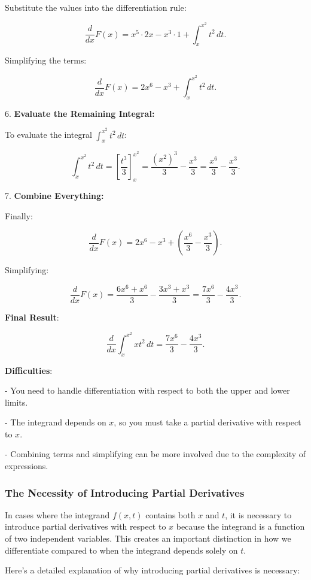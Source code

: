 \documentclass[a4paper,12pt]{book}
\begin{document}
   Substitute the values into the differentiation rule:

   \[
   \dfrac{d}{dx} F(x) = x^5 \cdot 2x - x^3 \cdot 1 + \int_{x}^{x^2} t^2 \, dt.
   \]

   Simplifying the terms:

   \[
   \dfrac{d}{dx} F(x) = 2x^6 - x^3 + \int_{x}^{x^2} t^2 \, dt.
   \]

6. \textbf{Evaluate the Remaining Integral:}

   To evaluate the integral \(\int_{x}^{x^2} t^2 \, dt\):

   \[
   \int_{x}^{x^2} t^2 \, dt = \left[ \dfrac{t^3}{3} \right]_{x}^{x^2} = \dfrac{(x^2)^3}{3} - \dfrac{x^3}{3} = \dfrac{x^6}{3} - \dfrac{x^3}{3}.
   \]

7. \textbf{Combine Everything:}

   Finally:

   \[
   \dfrac{d}{dx} F(x) = 2x^6 - x^3 + \left( \dfrac{x^6}{3} - \dfrac{x^3}{3} \right).
   \]

   Simplifying:

   \[
   \dfrac{d}{dx} F(x) = \dfrac{6x^6 + x^6}{3} - \dfrac{3x^3 + x^3}{3} = \dfrac{7x^6}{3} - \dfrac{4x^3}{3}.
   \]

\textbf{Final Result}:

\[
\dfrac{d}{dx} \int_{x}^{x^2} xt^2 \, dt = \dfrac{7x^6}{3} - \dfrac{4x^3}{3}.
\]

\textbf{Difficulties}:

- You need to handle differentiation with respect to both the upper and lower limits.

- The integrand depends on \(x\), so you must take a partial derivative with respect to \(x\).

- Combining terms and simplifying can be more involved due to the complexity of expressions.

\subsubsection{The Necessity of Introducing Partial Derivatives}

In cases where the integrand \( f(x, t) \) contains both \( x \) and \( t \), it is necessary to introduce partial derivatives with respect to \( x \) because the integrand is a function of two independent variables. This creates an important distinction in how we differentiate compared to when the integrand depends solely on \( t \).

Here's a detailed explanation of why introducing partial derivatives is necessary:
\end{document}
